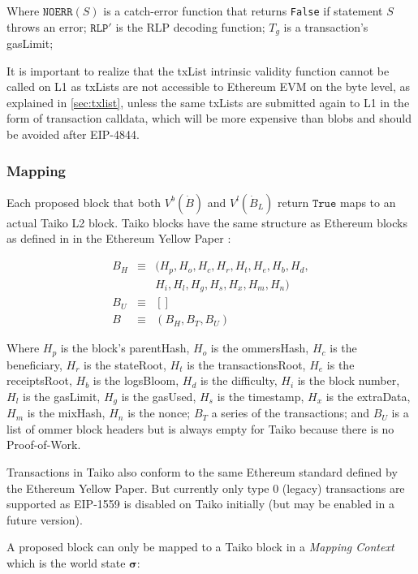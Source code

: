 \documentclass[9pt,oneside]{amsart}
\begin{document}
\begin{multicols}{2}
Where $\texttt{NOERR}(S)$ is a catch-error function that returns \texttt{False} if statement $S$ throws an error; $\texttt{RLP}'$ is the RLP decoding function;  $T_g$ is a transaction's gasLimit; 


It is important to realize that the txList intrinsic validity function cannot be called on L1 as txLists are not accessible to Ethereum EVM on the byte level, as explained in \ref{sec:txlist}, unless the same txLists are submitted again to L1 in the form of transaction calldata, which will be more expensive than blobs and should be avoided after EIP-4844.

\subsubsection{Mapping}

Each proposed block that both $V^b(\dot{B})$ and $V^l(\dot{B}_L)$ return $\texttt{True}$ maps to an actual Taiko L2 block. Taiko blocks have the same structure as Ethereum blocks as defined in in the Ethereum Yellow Paper \cite{ethyellowpaper}:

\begin{eqnarray}
B_H & \equiv & (H_p, H_o, H_c, H_r, H_t, H_e, H_b, H_d, \\
\nonumber & & H_i, H_l,H_g, H_s, H_x, H_m, H_n) \\
B_U  & \equiv & [] \\
B & \equiv & (B_H, B_T, B_U)
\end{eqnarray}

Where $H_p$ is the block's parentHash, $H_o$ is the ommersHash, $H_c$ is the beneficiary, $H_r$ is the stateRoot, $H_t$ is the transactionsRoot, $H_e$ is the receiptsRoot, $H_b$ is the logsBloom, $H_d$ is the difficulty, $H_i$ is the block number, $H_l$ is the gasLimit, $H_g$ is the gasUsed, $H_s$ is the timestamp, $H_x$ is the extraData, $H_m$ is the mixHash, $H_n$ is the nonce; $B_T$ a series of the transactions; and $B_U$ is a list of ommer block headers but is always empty for Taiko because there is no Proof-of-Work.

Transactions in Taiko also conform to the same Ethereum standard defined by the Ethereum Yellow Paper. But currently only type 0 (legacy)  transactions are supported as EIP-1559 is disabled on Taiko initially (but may be enabled in a future version).

A proposed block can only be mapped to a Taiko block in a \textit{Mapping Context} which is the world state $\boldsymbol{\sigma}$:


\end{multicols}
\end{document}
